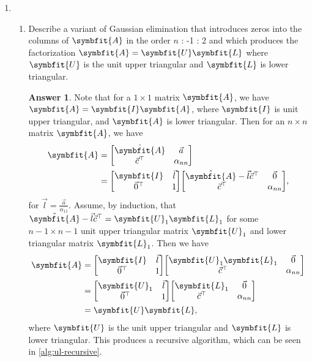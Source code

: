 \documentclass{article}
\theoremstyle{definition}
\newtheorem*{answer}{Answer}
\newcommand{\mat}[1]{\symbfit{#1}}
\begin{document}
\begin{enumerate}[leftmargin=\labelsep]
	\item
	      \begin{enumerate}
		      \item Describe a variant of Gaussian elimination that introduces zeros into the columns of \(\mat{A}\) in the order \(n\) : -1 : 2 and which produces the factorization \(\mat{A} = \mat{U}\mat{L}\) where \(\mat{U}\) is the unit upper triangular and \(\mat{L}\) is lower triangular.
		            \begin{answer}
			            Note that for a \(1 \times 1\) matrix \(\mat{A}\), we have \(\mat{A} = \mat{I}\mat{A}\), where \(\mat{I}\) is unit upper triangular, and \(\mat{A}\) is lower triangular. Then for an \(n \times n\) matrix \(\mat{A}\), we have
			            \begin{align}
				            \mat{A} & = \mqty[\hat{\mat{A}} & \vec{a} \\\vec{c}^\top&\alpha_{nn}]\\
				                    & = \mqty[\mat{I}       & \vec{l} \\\vec{0}^\top&1]\mqty[\hat{\mat{A}}-\vec{l}\vec{c}^\top&\vec{0}\\\vec{c}^\top&\alpha_{nn}],
			            \end{align}
			            for \(\vec{l} = \frac{\vec{a}}{\alpha_{11}}\). Assume, by induction, that \(\hat{\mat{A}}-\vec{l}\vec{c}^\top = \mat{U}_1\mat{L}_1\) for some \(n-1 \times n-1\) unit upper triangular matrix \(\mat{U}_1\) and lower triangular matrix \(\mat{L}_1\). Then we have
			            \begin{align*}
				            \mat{A} & = \mqty[\mat{I}   & \vec{l} \\\vec{0}^\top&1]\mqty[\mat{U}_1\mat{L}_1&\vec{0}\\\vec{c}^\top&\alpha_{nn}]\\
				                    & = \mqty[\mat{U}_1 & \vec{l} \\\vec{0}^\top&1]\mqty[\mat{L}_1&\vec{0}\\\vec{c}^\top&\alpha_{nn}]\\
				                    & = \mat{U}\mat{L},
			            \end{align*}
			            where \(\mat{U}\) is the unit upper triangular and \(\mat{L}\) is lower triangular. This produces a recursive algorithm, which can be seen in \cref{alg:ul-recursive}.


\end{answer}
\end{enumerate}
\end{enumerate}
\end{document}
